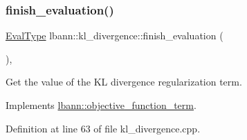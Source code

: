 \mbox{\label{classlbann_1_1kl__divergence_a93aab2ca89cdaab075a940184ae209d5}} 
\subsubsection{\texorpdfstring{finish\+\_\+evaluation()}{finish\_evaluation()}}
{\footnotesize\ttfamily \hyperlink{base_8hpp_a3266f5ac18504bbadea983c109566867}{Eval\+Type} lbann\+::kl\+\_\+divergence\+::finish\+\_\+evaluation (\begin{DoxyParamCaption}{ }\end{DoxyParamCaption})\hspace{0.3cm}{\ttfamily [override]}, {\ttfamily [virtual]}}

Get the value of the KL divergence regularization term. 

Implements \hyperlink{classlbann_1_1objective__function__term_a7a82f2cdbc954655ac860896306aed0c}{lbann\+::objective\+\_\+function\+\_\+term}.



Definition at line 63 of file kl\+\_\+divergence.\+cpp.


